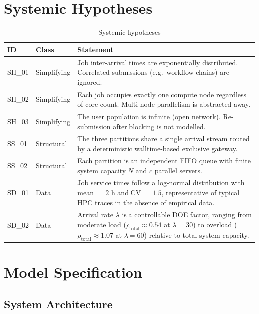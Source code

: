 \documentclass[11pt,a4paper]{article}
\newcommand{\lam}{\ensuremath{\lambda}}
\begin{document}
\section{Systemic Hypotheses}

\begin{table}[H]
\centering
\caption{Systemic hypotheses}
\begin{tabularx}{\linewidth}{llX}
\toprule
\textbf{ID} & \textbf{Class} & \textbf{Statement} \\
\midrule
SH\_01 & Simplifying & Job inter-arrival times are exponentially distributed. Correlated submissions (e.g.\ workflow chains) are ignored. \\
SH\_02 & Simplifying & Each job occupies exactly one compute node regardless of core count. Multi-node parallelism is abstracted away. \\
SH\_03 & Simplifying & The user population is infinite (open network). Re-submission after blocking is not modelled. \\
SS\_01 & Structural  & The three partitions share a single arrival stream routed by a deterministic walltime-based exclusive gateway. \\
SS\_02 & Structural  & Each partition is an independent FIFO queue with finite system capacity $N$ and $c$ parallel servers. \\
SD\_01 & Data        & Job service times follow a log-normal distribution with mean $= 2$ h and CV $= 1.5$, representative of typical HPC traces in the absence of empirical data. \\
SD\_02 & Data        & Arrival rate $\lam$ is a controllable DOE factor, ranging from moderate load ($\rho_\text{total} \approx 0.54$ at $\lam=30$) to overload ($\rho_\text{total} \approx 1.07$ at $\lam=60$) relative to total system capacity. \\
\bottomrule
\end{tabularx}
\end{table}

\section{Model Specification}

\subsection{System Architecture}
\end{document}
